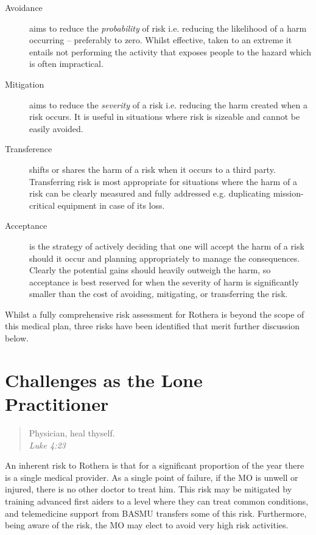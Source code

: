 \documentclass[12pt,a4paper]{article}
\begin{document}
\begin{description}
    \item[Avoidance] aims to reduce the \emph{probability} of risk i.e. reducing the likelihood of a harm occurring -- preferably to zero. Whilst effective, taken to an extreme it entails not performing the activity that exposes people to the hazard which is often impractical.
    \item[Mitigation] aims to reduce the \emph{severity} of a risk i.e. reducing the harm created when a risk occurs. It is useful in situations where risk is sizeable and cannot be easily avoided.
    \item[Transference] shifts or shares the harm of a risk when it occurs to a third party. Transferring risk is most appropriate for situations where the harm of a risk can be clearly measured and fully addressed e.g. duplicating mission-critical equipment in case of its loss.
    \item[Acceptance] is the strategy of actively deciding that one will accept the harm of a risk should it occur and planning appropriately to manage the consequences. Clearly the potential gains should heavily outweigh the harm, so acceptance is best reserved for when the severity of harm is significantly smaller than the cost of avoiding, mitigating, or transferring the risk.
\end{description}

Whilst a fully comprehensive risk assessment for Rothera is beyond the scope of this medical plan, three risks have been identified that merit further discussion below.

\section{Challenges as the Lone Practitioner}

\begin{quote}
Physician, heal thyself. \\
\em Luke 4:23
\end{quote}

An inherent risk to Rothera is that for a significant proportion of the year there is a single medical provider. As a single point of failure, if the MO is unwell or injured, there is no other doctor to treat him. This risk may be mitigated by training advanced first aiders to a level where they can treat common conditions, and telemedicine support from BASMU transfers some of this risk. Furthermore, being aware of the risk, the MO may elect to avoid very high risk activities.
\end{document}
